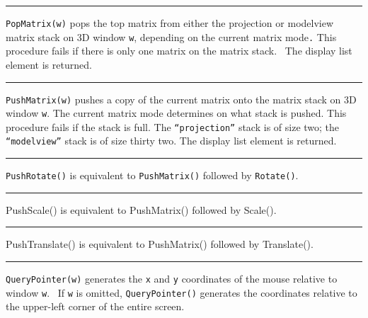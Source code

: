 \bigskip\hrule\vspace{0.1cm}

\noindent
\texttt{PopMatrix(w)} pops the top matrix from either the projection or
modelview matrix stack on 3D window \texttt{w}, depending on the
current matrix mode\texttt{.} This procedure fails if there is only one
matrix on the matrix stack. \ The display list element is returned. 

\bigskip\hrule\vspace{0.1cm}

\noindent
\texttt{PushMatrix(w)} pushes a copy of the current matrix onto the
matrix stack on 3D window \texttt{w}. The current matrix mode
determines on what stack is pushed. This procedure fails if the stack
is full. The \texttt{{\textquotedblleft}projection{\textquotedblright}}
stack is of size two; the
\texttt{{\textquotedblleft}modelview{\textquotedblright}} stack is of
size thirty two. The display list element is returned.

\bigskip\hrule\vspace{0.1cm}

\noindent
\texttt{PushRotate()} is equivalent to \texttt{PushMatrix()} followed by
\texttt{Rotate()}.

\bigskip\hrule\vspace{0.1cm}

\noindent
{\sffamily
PushScale()\textrm{ is equivalent to }PushMatrix()\textrm{ followed by
}Scale()\textrm{.}}

\bigskip\hrule\vspace{0.1cm}

\noindent
{\sffamily
PushTranslate()\textrm{ is equivalent to }PushMatrix()\textrm{ followed
by }Translate()\textrm{.}}

\bigskip\hrule\vspace{0.1cm}

\noindent
\texttt{QueryPointer(w)} generates the \texttt{x} and \texttt{y}
coordinates of the mouse relative to window \texttt{w}. \ If \texttt{w}
is omitted, \texttt{QueryPointer()} generates the coordinates relative
to the upper-left corner of the entire screen.

